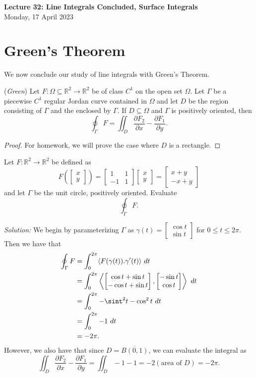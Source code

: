 \documentclass[11pt]{article}
\theoremstyle{definition}
\newcommand{\R}{\mathbb{R}}                      %
\newcommand{\mat}{\begin{bmatrix}}
\newcommand{\trix}{\end{bmatrix}}
\newcommand{\dell}{\partial}
\begin{document}
\thispagestyle{empty}

\begin{center}
{\LARGE \bf Lecture 32: Line Integrals Concluded, Surface Integrals}\\
{\large Monday, 17 April 2023}\\
\end{center}

\section{Green's Theorem}

We now conclude our study of line integrals with Green's Theorem.

\begin{shaded}
\theorem (\textit{Green}) Let $F:\Omega\subseteq \R^2\to \R^2$ be of class $C^1$ on the open set $\Omega$. Let $\Gamma$ be a piecewise $C^1$ regular Jordan curve contained in $\Omega$ and let $D$ be the region consisting of $\Gamma$ and the enclosed by $\Gamma$. If $D\subseteq \Omega$ and $\Gamma$ is positively oriented, then 
$$
\oint_\Gamma F = \iint_D \frac{\dell F_2}{\dell x} -\frac{\dell F_1}{\dell y}.
$$
\end{shaded}

\begin{proof}
    For homework, we will prove the case where $D$ is a rectangle.
\end{proof}

\ex Let $F:\R^2\to\R^2$ be defined as
$$
F\left(\mat x \\ y \trix\right) = \mat 1 & 1 \\ -1 & 1 \trix \mat x \\ y \trix = \mat x + y \\ -x + y \trix
$$
and let $\Gamma$ be the unit circle, positively oriented. Evaluate
$$
\oint_\Gamma F.
$$

\textit{Solution:} We begin by parameterizing $\Gamma$ as $\gamma(t) = \mat\cos t \\ \sin t \trix$ for $0\leq t\leq 2\pi$. Then we have that
$$
\begin{aligned}
    \oint_\Gamma F &= \int_0^{2\pi} \langle F(\gamma(t)). \gamma'(t) \rangle ~dt \\
                &= \int_0^{2\pi} \left\langle \mat \cos t + \sin t \\ -\cos t + \sin t \trix , \mat -\sin t \\ \cos t \trix \right\rangle ~dt\\
                &=\int_0^{2\pi} -\sint^2 t - \cos^2 t~dt\\
                &=\int_0^{2\pi} -1~dt\\
                &=-2\pi.
\end{aligned}
$$
However, we also have that since $D=\overline{B(0,1)}$, we can evaluate the integral as
$$
\iint_D \frac{\dell F_2}{\dell x} - \frac{\dell F_1}{\dell y}= \iint_D -1-1 = -2(\mbox{area of } D) = -2\pi.
$$
\end{document}
